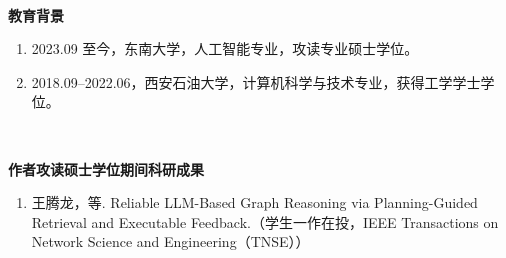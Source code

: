 

~~

\begin{flushleft}
  \bfseries\large 教育背景\\
  \relax
\end{flushleft}

\begin{enumerate}
  \renewcommand{\labelenumi}{\theenumi.}
  \item 2023.09 至今，东南大学，人工智能专业，攻读专业硕士学位。
  \item 2018.09--2022.06，西安石油大学，计算机科学与技术专业，获得工学学士学位。
\end{enumerate}

~~

\begin{flushleft}
  \bfseries\large 作者攻读硕士学位期间科研成果\\
  \relax
\end{flushleft}

\begin{enumerate}
  \renewcommand{\labelenumi}{[\theenumi].}
  \item 王腾龙，等. Reliable LLM-Based Graph Reasoning via Planning-Guided Retrieval and Executable Feedback.（学生一作在投，IEEE Transactions on Network Science and Engineering（TNSE））
\end{enumerate}
